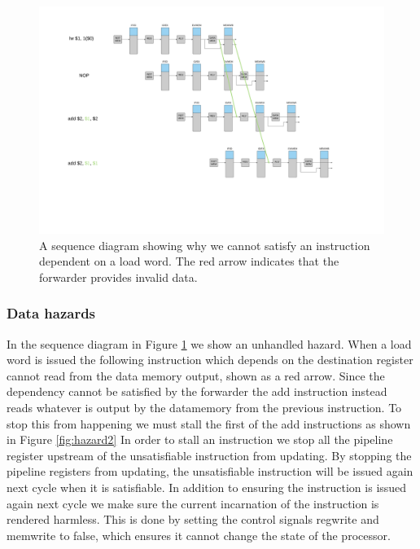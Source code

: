 \begin{figure}[h!]
    \includegraphics[width=\linewidth]{img/lw_hazard.png}
    \caption{A sequence diagram showing why we cannot satisfy an instruction dependent on a load word. The red arrow indicates that the forwarder provides invalid data.}
    \label{fig:hazard1}
\end{figure}

\subsubsection{Data hazards}
In the sequence diagram in Figure \ref{fig:hazard1} we show an unhandled hazard. When a load word is issued the following instruction which depends on the destination register cannot read from the data memory output, shown as a red arrow.
Since the dependency cannot be satisfied by the forwarder the add instruction instead reads whatever is output by the datamemory from the previous instruction.
To stop this from happening we must stall the first of the add instructions as shown in Figure \ref{fig:hazard2} 
In order to stall an instruction we stop all the pipeline register upstream of the unsatisfiable instruction from updating. 
By stopping the pipeline registers from updating, the unsatisfiable instruction will be issued again next cycle when it is satisfiable.
In addition to ensuring the instruction is issued again next cycle we make sure the current incarnation of the instruction is rendered harmless.
This is done by setting the control signals regwrite and memwrite to false, which ensures it cannot change the state of the processor.

